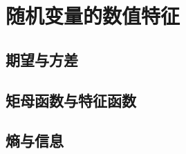 \documentclass[../main]{subfiles}
\begin{document}
\chapter{随机变量的数值特征}

\section{期望与方差}

\section{矩母函数与特征函数}

\section{熵与信息}
\end{document}
